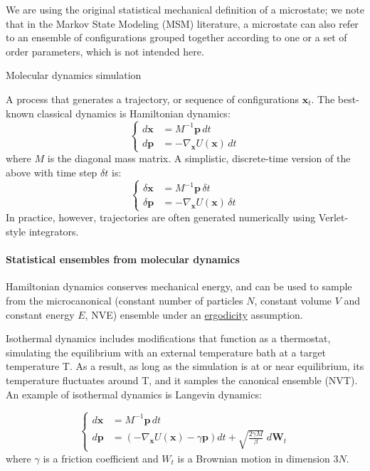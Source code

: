 \documentclass[9pt,review]{livecoms}
\newcommand{\vx}{\mathbf{x}}
\newcommand{\vp}{\mathbf{p}}
\begin{document}
We are using the original statistical mechanical definition of a microstate; we note that in the Markov State Modeling (MSM) literature, a microstate can also refer to an ensemble of configurations grouped together according to one or a set of order parameters, which is not intended here.

\hypertarget{ref:MolecularDynamics}{Molecular dynamics simulation}
A process that generates a trajectory, or sequence of configurations $\vx_t$.
The best-known classical dynamics is Hamiltonian dynamics:
\begin{equation}
\left\{
\begin{array}{ll}
    d\vx &= M^{-1} \vp \,  dt \\
    d\vp &= -\nabla_\vx U(\vx) \, dt
\end{array}
\right.
    \label{eq:md}
\end{equation}
where $M$ is the diagonal mass matrix.
A simplistic, discrete-time version of the above with time step $\delta t$ is:
\begin{equation}
\left\{
\begin{array}{ll}
    \delta \vx &= M^{-1} \vp \, \delta t \\
    \delta \vp &= -\nabla_\vx U(\vx) \, \delta t
    \label{eq:md_discrete}
\end{array}
\right.
\end{equation}
In practice, however, trajectories are often generated numerically using Verlet-style integrators.


\hypertarget{ref:Ensemble} {\paragraph{Statistical ensembles from molecular dynamics}}
Hamiltonian dynamics conserves mechanical energy, and can be used to sample from the microcanonical (constant number of particles $N$, constant volume $V$ and constant energy $E$, NVE) ensemble under an \hyperlink{ref:ergodic} {ergodicity} assumption.

Isothermal dynamics includes modifications that function as a thermostat, simulating the equilibrium with an external temperature bath at a target temperature T.
As a result, as long as the simulation is at or near equilibrium, its temperature fluctuates around T, and it samples the canonical ensemble (NVT).
An example of isothermal dynamics is \hypertarget{ref:Langevin} {Langevin dynamics}:

\begin{equation}
\left\{
\begin{array}{ll}
    d\vx &= M^{-1} \vp \,  dt \\
    d\vp &= \left(-\nabla_\vx U(\vx) - \gamma \vp \right) dt
    + \sqrt{ \frac{2 \gamma M}{\beta}} \; d\mathbf{W}_t
\end{array}
\right.
\end{equation}
where $\gamma$ is a friction coefficient and ${W}_t$ is a Brownian motion in dimension $3N$.
\end{document}
